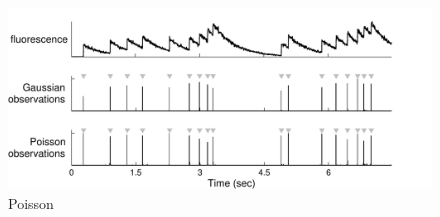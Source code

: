 % 

\begin{figure}[h!]
\centering \includegraphics[width=.9\linewidth]{../figs/poisson}
\caption{Poisson} \label{fig:poiss}
\end{figure}
